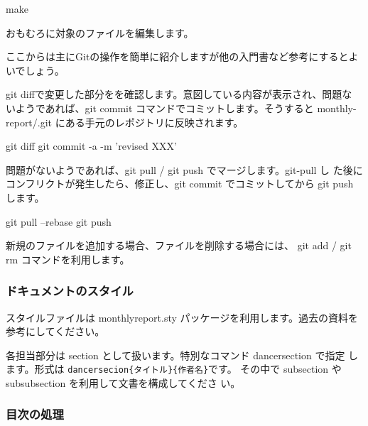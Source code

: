 \documentclass[mingoth,a4paper]{jsarticle}
\begin{document}
\begin{commandline}
 make
\end{commandline}

おもむろに対象のファイルを編集します。

ここからは主にGitの操作を簡単に紹介しますが他の入門書など参考にするとよいでしょう。

git diffで変更した部分をを確認します。意図している内容が表示され、問題な
いようであれば、git commit コマンドでコミットします。そうすると
monthly-report/.git にある手元のレポジトリに反映されます。

\begin{commandline}
 git diff
 git commit -a -m 'revised XXX'
\end{commandline}

問題がないようであれば、git pull / git push でマージします。git-pull し
た後にコンフリクトが発生したら、修正し、git commit でコミットしてから
git push します。

\begin{commandline}
 git pull --rebase
 git push 
\end{commandline}

新規のファイルを追加する場合、ファイルを削除する場合には、 git add /
git rm コマンドを利用します。

\subsubsection{ドキュメントのスタイル}

スタイルファイルは monthlyreport.sty パッケージを利用します。過去の資料を参考にしてください。

\begin{commandline}
\usepackage{monthlyreport} 
\end{commandline}

各担当部分は section として扱います。特別なコマンド dancersection で指定
します。形式は \texttt{dancersecion\{タイトル\}\{作者名\}}です。
その中で subsection や subsubsection を利用して文書を構成してくださ
い。

\begin{commandline}
 \label{sec:debmtg2007howtoprepare}
\end{commandline}

\subsubsection{目次の処理}
\end{document}
